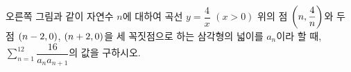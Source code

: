 \noindent\begin{minipage}[t]{0.58\linewidth}\vspace{0pt}\raggedright 오른쪽 그림과 같이 자연수 $n$에 대하여 곡선 $y=\dfrac{4}{x}$ $(x>0)$ 위의 점 $\left(n{,}\mkern3mu\mathopen{}\dfrac{4}{n}\right)$와 두 점 $(n-2{,}\mkern3mu\mathopen{}0)$, $(n+2{,}\mkern3mu\mathopen{}0)$을 세 꼭짓점으로 하는 삼각형의 넓이를 $a_n$이라 할 때, $\displaystyle\sum_{n=1}^{12} \dfrac{16}{a_n a_{n+1}}$의 값을 구하시오.\end{minipage}\hfill\begin{minipage}[t]{0.4\linewidth}\vspace{0pt}\centering \resizebox{\ifdim\width>\linewidth\linewidth\else\width\fi}{!}{}\end{minipage}\par
